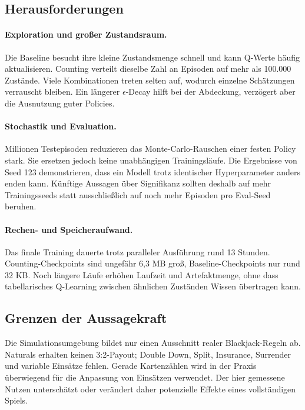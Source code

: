 \subsection{Herausforderungen}

\paragraph{Exploration und großer Zustandsraum.}
Die Baseline besucht ihre kleine Zustandsmenge schnell und kann
Q-Werte häufig aktualisieren. Counting verteilt dieselbe Zahl an
Episoden auf mehr als 100.000 Zustände. Viele Kombinationen treten
selten auf, wodurch einzelne Schätzungen verrauscht bleiben. Ein
längerer $\epsilon$-Decay hilft bei der Abdeckung, verzögert aber die
Ausnutzung guter Policies.

\paragraph{Stochastik und Evaluation.}
Millionen Testepisoden reduzieren das Monte-Carlo-Rauschen einer
festen Policy stark. Sie ersetzen jedoch keine unabhängigen
Trainingsläufe. Die Ergebnisse von Seed 123 demonstrieren, dass ein
Modell trotz identischer Hyperparameter anders enden kann. Künftige
Aussagen über Signifikanz sollten deshalb auf mehr Trainingsseeds
statt ausschließlich auf noch mehr Episoden pro Eval-Seed beruhen.

\paragraph{Rechen- und Speicheraufwand.}
Das finale Training dauerte trotz paralleler Ausführung rund 13
Stunden. Counting-Checkpoints sind ungefähr 6,3 MB groß,
Baseline-Checkpoints nur rund 32 KB. Noch längere Läufe erhöhen
Laufzeit und Artefaktmenge, ohne dass tabellarisches Q-Learning
zwischen ähnlichen Zuständen Wissen übertragen kann.

\subsection{Grenzen der Aussagekraft}

Die Simulationsumgebung bildet nur einen Ausschnitt realer
Blackjack-Regeln ab. Naturals erhalten keinen 3:2-Payout; Double
Down, Split, Insurance, Surrender und variable Einsätze fehlen.
Gerade Kartenzählen wird in der Praxis überwiegend für die Anpassung
von Einsätzen verwendet. Der hier gemessene Nutzen unterschätzt oder
verändert daher potenzielle Effekte eines vollständigen Spiels.

